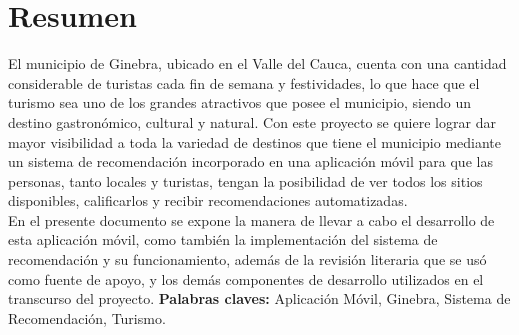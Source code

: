 \documentclass[12pt,letterpaper,openany]{book}
\begin{document}
\newpage
\listoffigures %

\newpage
\listoftables %

\chapter*{Resumen} %
El municipio de Ginebra, ubicado en el Valle del Cauca, cuenta con una cantidad considerable de turistas cada fin de semana y festividades, lo que hace que el turismo sea uno de los grandes atractivos que posee el municipio, siendo un destino gastronómico, cultural y natural. Con este proyecto se quiere lograr dar mayor visibilidad a toda la variedad de destinos que tiene el municipio mediante un sistema de recomendación incorporado en una aplicación móvil para que las personas, tanto locales y turistas, tengan la posibilidad de ver todos los sitios disponibles, calificarlos y recibir recomendaciones automatizadas.\\
En el presente documento se expone la manera de llevar a cabo el desarrollo de esta aplicación móvil, como también la implementación del sistema de recomendación y su funcionamiento, además de la revisión literaria que se usó como fuente de apoyo, y los demás componentes de desarrollo utilizados en el transcurso del proyecto.
\vspace{5mm}\newline
\textbf{Palabras claves:} Aplicación Móvil, Ginebra, Sistema de Recomendación, Turismo.


\end{document}
